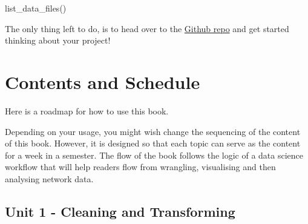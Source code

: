 \documentclass[
  letterpaper,
  DIV=11,
  numbers=noendperiod]{scrreprt}
\newenvironment{Shaded}{\begin{snugshade}}{\end{snugshade}}
\newcommand{\FunctionTok}[1]{\textcolor[rgb]{0.28,0.35,0.67}{#1}}
\newcommand{\NormalTok}[1]{\textcolor[rgb]{0.00,0.23,0.31}{#1}}
\begin{document}
\begin{Shaded}
\begin{Highlighting}[]
\FunctionTok{list\_data\_files}\NormalTok{()}
\end{Highlighting}
\end{Shaded}

The only thing left to do, is to head over to the
\href{https://github.com/Tom-R-Leppard/SP25_SNA_Book/tree/main/Social\%20Network\%20Analysis\%20-\%20Data}{Github
repo} and get started thinking about your project!

\chapter{Contents and Schedule}\label{contents-and-schedule}

Here is a roadmap for how to use this book.

Depending on your usage, you might wish change the sequencing of the
content of this book. However, it is designed so that each topic can
serve as the content for a week in a semester. The flow of the book
follows the logic of a data science workflow that will help readers flow
from wrangling, visualising and then analysing network data.

\section{Unit 1 - Cleaning and
Transforming}\label{unit-1---cleaning-and-transforming}
\end{document}
